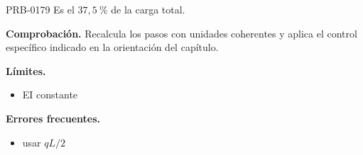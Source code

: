 \begin{studiumworked}{PRB-0179}
Es el $37{,}5\ \%$ de la carga total.

\par\textbf{Comprobación.} Recalcula los pasos con unidades coherentes y aplica el control específico indicado en la orientación del capítulo.

\textbf{Límites.}\begin{itemize}\item EI constante\end{itemize}

\textbf{Errores frecuentes.}\begin{itemize}\item usar $qL/2$\end{itemize}

\end{studiumworked}

\Needspace{.3\textheight}

